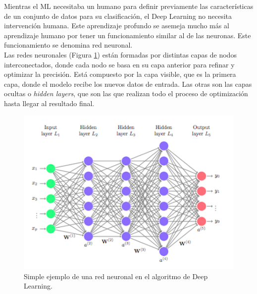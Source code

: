 Mientras el ML necesitaba un humano para definir previamente las características de un conjunto de datos para su clasificación, el Deep Learning no necesita intervención humana. Este aprendizaje profundo se asemeja mucho más al aprendizaje humano por tener un funcionamiento similar al de las neuronas. Este funcionamiento se denomina red neuronal.\\

Las redes neuronales (Figura \ref{fig:red}) están formadas por distintas capas de nodos interconectados, donde cada nodo se basa en su capa anterior para refinar y optimizar la precisión. Está compuesto por la capa visible, que es la primera capa, donde el modelo recibe los nuevos datos de entrada. Las otras son las capas ocultas o \textit{hidden layers}, que son las que realizan todo el proceso de optimización hasta llegar al resultado final.\\
\begin{figure} [h!]
  \begin{center}
    \includegraphics[width=12cm]{figs/deep_learning}
  \end{center}
  \caption{Simple ejemplo de una red neuronal en el algoritmo de Deep Learning.}
  \label{fig:red}
\end{figure}

